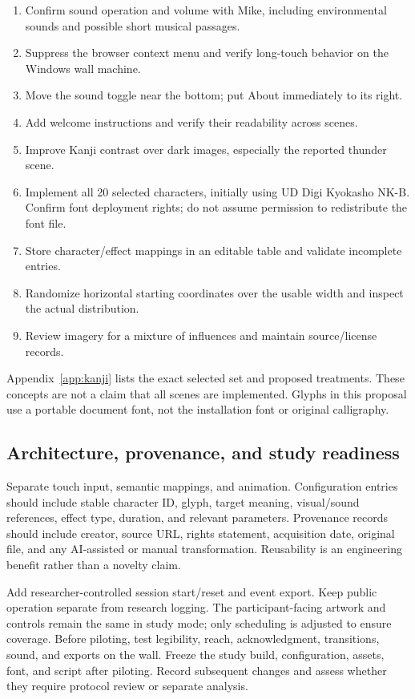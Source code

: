 \documentclass[11pt,letterpaper]{article}
\begin{document}
\begin{enumerate}
\item Confirm sound operation and volume with Mike, including environmental sounds and possible short musical passages.
\item Suppress the browser context menu and verify long-touch behavior on the Windows wall machine.
\item Move the sound toggle near the bottom; put About immediately to its right.
\item Add welcome instructions and verify their readability across scenes.
\item Improve Kanji contrast over dark images, especially the reported thunder scene.
\item Implement all 20 selected characters, initially using UD Digi Kyokasho NK-B. Confirm font deployment rights; do not assume permission to redistribute the font file.
\item Store character/effect mappings in an editable table and validate incomplete entries.
\item Randomize horizontal starting coordinates over the usable width and inspect the actual distribution.
\item Review imagery for a mixture of influences and maintain source/license records.
\end{enumerate}

Appendix~\ref{app:kanji} lists the exact selected set and proposed treatments. These concepts are not a claim that all scenes are implemented. Glyphs in this proposal use a portable document font, not the installation font or original calligraphy.

\subsection{Architecture, provenance, and study readiness}
Separate touch input, semantic mappings, and animation. Configuration entries should include stable character ID, glyph, target meaning, visual/sound references, effect type, duration, and relevant parameters. Provenance records should include creator, source URL, rights statement, acquisition date, original file, and any AI-assisted or manual transformation. Reusability is an engineering benefit rather than a novelty claim.

Add researcher-controlled session start/reset and event export. Keep public operation separate from research logging. The participant-facing artwork and controls remain the same in study mode; only scheduling is adjusted to ensure coverage. Before piloting, test legibility, reach, acknowledgment, transitions, sound, and exports on the wall. Freeze the study build, configuration, assets, font, and script after piloting. Record subsequent changes and assess whether they require protocol review or separate analysis.
\end{document}
